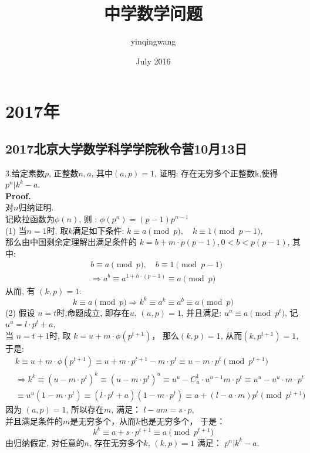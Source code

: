 \documentclass[UTF8]{article}
\title{中学数学问题}
\author{yinqingwang }
\date{July 2016}
\begin{document}
	\maketitle
	\tableofcontents
\newpage
\section{2017年}



\subsection{2017北京大学数学科学学院秋令营10月13日}

\noindent 3.给定素数$p$, 正整数$n,a$, 其中$(a,p)=1$, 证明: 存在无穷多个正整数k,使得 $p^n|k^k-a$.\\
\textbf{Proof.}\\
对$n$归纳证明. \\
记欧拉函数为$\phi (n)$, 则 : $\phi (p^n) = (p-1)p^{n-1}$ \\
(1) 当$n=1$时, 取$k$满足如下条件: $k \equiv a \pmod p ,\quad	k \equiv 1 \pmod {p-1}$, \\
那么由中国剩余定理解出满足条件的 $k = b + m\cdot p(p-1) , 0<b < p(p-1)$, 其中: 
\begin{eqnarray*}
&	b \equiv a \pmod p ,\quad	b \equiv 1 \pmod {p-1} \\
&	\Longrightarrow a^b \equiv a^{1+h\cdot (p-1)} \equiv a \pmod p
\end{eqnarray*}
从而, 有 $(k,p)=1$:
$$k \equiv a \pmod p \Longrightarrow k^k \equiv a^k \equiv a^b \equiv a \pmod p$$ 
(2) 假设 $n=t$时,命题成立, 即存在$u$, $(u,p)=1$, 并且满足: $u^u \equiv a \pmod {p^t}$, 记 $u^u = l\cdot p^t + a$,\\
当 $n=t+1$时, 取 $k=u + m\cdot \phi (p^{t+1})$， 那么$(k,p)=1$, 从而$(k,p^{t+1}) =1$, 于是: 
\begin{eqnarray*}
	& k \equiv u+m\cdot \phi(p^{t+1}) \equiv u + m\cdot p^{t+1} - m\cdot p^t \equiv u-m\cdot p^t \pmod{p^{t+1}}\\
	&\Longrightarrow  k^k \equiv (u-m\cdot p^t)^k \equiv (u-m\cdot p^t)^u \equiv u^u -C_u^1\cdot u^{u-1} m\cdot p^t \equiv u^u - u^u\cdot m\cdot p^t \\
	& \equiv u^u(1-m\cdot p^t) \equiv (l\cdot p^t +a)(1-m\cdot p^t) \equiv a + (l-a\cdot m)p^t \pmod{p^{t+1}}
\end{eqnarray*}
因为 $(a,p)=1$, 所以存在$m$, 满足： $l-am=s\cdot p$, \\
并且满足条件的$m$是无穷多个，从而$k$也是无穷多个， 于是：
$$ k^k \equiv a + s\cdot p^{t+1} \equiv a \pmod {p^{t+1}}$$
由归纳假定, 对任意的$n$, 存在无穷多个$k$, $(k,p)=1$ 满足： $p^n|k^k-a$.
\end{document}

